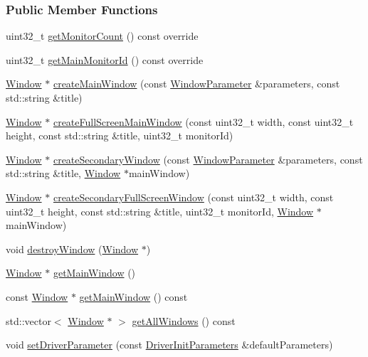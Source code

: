 \subsubsection*{Public Member Functions}
\begin{DoxyCompactItemize}
\item 
uint32\+\_\+t \hyperlink{a00089_a1f52cf717fa2ca568833416b126975cd}{get\+Monitor\+Count} () const  override
\item 
uint32\+\_\+t \hyperlink{a00089_a21001322db84287f4ada31f645e0da93}{get\+Main\+Monitor\+Id} () const  override
\item 
\hyperlink{a00082}{Window} $\ast$ \hyperlink{a00087_a863ac648c2c2a93a57c4a898fb176718}{create\+Main\+Window} (const \hyperlink{a00091}{Window\+Parameter} \&parameters, const std\+::string \&title)
\item 
\hyperlink{a00082}{Window} $\ast$ \hyperlink{a00087_a9c2adc3003612cafb99fd7a156bc9655}{create\+Full\+Screen\+Main\+Window} (const uint32\+\_\+t width, const uint32\+\_\+t height, const std\+::string \&title, uint32\+\_\+t monitor\+Id)
\item 
\hyperlink{a00082}{Window} $\ast$ \hyperlink{a00087_afc8f953d7aa1e2822b8ced1e5b855ab8}{create\+Secondary\+Window} (const \hyperlink{a00091}{Window\+Parameter} \&parameters, const std\+::string \&title, \hyperlink{a00082}{Window} $\ast$main\+Window)
\item 
\hyperlink{a00082}{Window} $\ast$ \hyperlink{a00087_a8d3b6392e5389e7e5706f92ceed96fa0}{create\+Secondary\+Full\+Screen\+Window} (const uint32\+\_\+t width, const uint32\+\_\+t height, const std\+::string \&title, uint32\+\_\+t monitor\+Id, \hyperlink{a00082}{Window} $\ast$main\+Window)
\item 
void \hyperlink{a00087_aecfb9aa6471ecf82e5c76a96440c275c}{destroy\+Window} (\hyperlink{a00082}{Window} $\ast$)
\item 
\hyperlink{a00082}{Window} $\ast$ \hyperlink{a00087_a7ccb3265cab90117a4face1c5ebb5e29}{get\+Main\+Window} ()
\item 
const \hyperlink{a00082}{Window} $\ast$ \hyperlink{a00087_aa59c328988c32399328f8f38c5210275}{get\+Main\+Window} () const 
\item 
std\+::vector$<$ \hyperlink{a00082}{Window} $\ast$ $>$ \hyperlink{a00087_a9aac4dcdd92008cd8602b7456be6260a}{get\+All\+Windows} () const 
\item 
void \hyperlink{a00087_a9aaa765ab360c7093dd1f1d3f5f3d621}{set\+Driver\+Parameter} (const \hyperlink{a00028}{Driver\+Init\+Parameters} \&default\+Parameters)
\end{DoxyCompactItemize}

